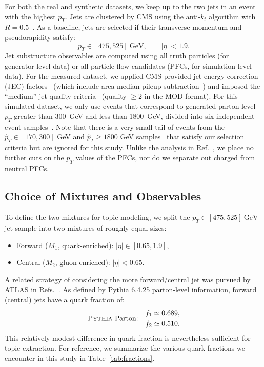 \documentclass[aps,prd,twocolumn,preprintnumbers,nofootinbib,longbibliography,floatfix]{revtex4-1}
\DeclareRobustCommand{\Tab}[1]{Table~\ref{#1}}
\DeclareRobustCommand{\Ref}[1]{Ref.~\cite{#1}}
\DeclareRobustCommand{\Refs}[1]{Refs.~\cite{#1}}
\newcommand{\GeV}{\text{GeV}}
\newcommand{\Pythia}{{\sc Pythia}\xspace}
\newcommand{\cor}[1]{#1}
\begin{document}
For both the real and synthetic datasets, we keep up to \cor{the two jets in an event with the highest $p_T$}.
%
Jets are clustered by CMS using the anti-$k_t$ algorithm with $R = 0.5$~\cite{Cacciari:2008gp,Cacciari:2011ma}.
%
As a baseline, jets are selected if their transverse momentum and pseudorapidity satisfy:
%
\begin{equation}
p_T \in [475,525]~\GeV, \qquad |\eta| < 1.9.
\end{equation}
%
Jet substructure observables are computed using all truth particles (for generator-level data) or all particle flow candidates (PFCs, for simulation-level data).
%
For the measured dataset, we applied CMS-provided jet energy correction (JEC) factors~\cite{CMS:2016lmd} (which include area-median pileup subtraction~\cite{Cacciari:2008gn}) and imposed the ``medium'' jet quality criteria~\cite{CMS:2010xta,2011JInst...611002C} (quality $\geq 2$ in the MOD format).
%
For this simulated dataset, we only use events that correspond to generated parton-level $p_T$ greater than \SI{300}{GeV} and less than \SI{1800}{GeV}, divided into six independent event samples~\cite{MOD:ZenodoMC300,MOD:ZenodoMC470,MOD:ZenodoMC600,MOD:ZenodoMC800,MOD:ZenodoMC1000,MOD:ZenodoMC1400}.
%
Note that there is a very small tail of events from the $\hat{p}_T \in [170, 300]$ GeV and  $\hat{p}_T\ge1800$ GeV samples~\cite{MOD:ZenodoMC170,MOD:ZenodoMC1800} that satisfy our selection criteria but are ignored for this study.
%
Unlike the analysis in \Ref{Komiske:2019jim}, we place no further cuts on the $p_T$ values of the PFCs, nor do we separate out charged from neutral PFCs.


\subsection{Choice of Mixtures and Observables}
\label{subsec:observables}

To define the two mixtures for topic modeling, we split the $p_T \in [475,525]~\GeV$ jet sample into two mixtures of roughly equal sizes:
%
\begin{itemize}
\item Forward ($M_1$, quark-enriched):  $|\eta| \in [0.65,1.9]$,
\item Central ($M_2$, gluon-enriched):  $|\eta| < 0.65$.
\end{itemize}
%
A related strategy of considering the more forward/central jet was pursued by ATLAS in \Refs{ATLAS:2015rlw,ATLAS:2016vxz,ATLAS:2019rqw}.
%
As defined by \Pythia \cor{6.4.25} parton-level information, forward (central) jets have a quark fraction of:
% 
\begin{equation}
	\label{eq:frac_exp_pythia}
	\text{\Pythia Parton:} \quad
	\begin{aligned}
		f_1 &\simeq 0.689, \\
		f_2 &\simeq 0.510.
	\end{aligned}
\end{equation}
%
This relatively modest difference in quark fraction is nevertheless sufficient for topic extraction.
%
For reference, we summarize the various quark fractions we encounter in this study in \Tab{tab:fractions}.
\end{document}

